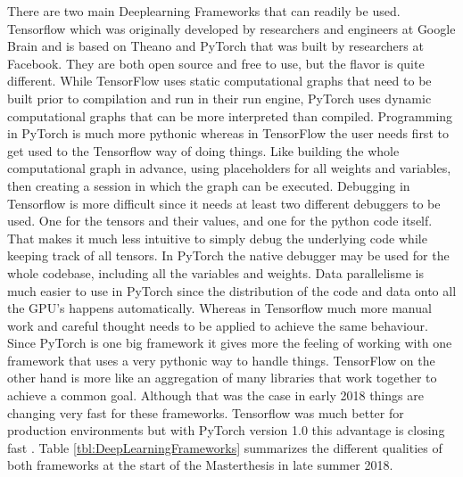 There are two main Deeplearning Frameworks that can readily be used. Tensorflow \cite{tensorflow} which was originally developed by researchers and engineers at Google Brain and is based on Theano and PyTorch \cite{pytorch} that was built by researchers at Facebook. They are both open source and free to use, but the flavor is quite different. While TensorFlow uses static computational graphs that need to be built prior to compilation and run in their run engine, PyTorch uses dynamic computational graphs that can be more interpreted than compiled. Programming in PyTorch is much more pythonic whereas in TensorFlow the user needs first to get used to the Tensorflow way of doing things. Like building the whole computational graph in advance, using placeholders for all weights and variables, then creating a session in which the graph can be executed. Debugging in Tensorflow is more difficult since it needs at least two different debuggers to be used. One for the tensors and their values, and one for the python code itself. That makes it much less intuitive to simply debug the underlying code while keeping track of all tensors. In PyTorch the native debugger may be used for the whole codebase, including all the variables and weights. Data parallelisme is much easier to use in PyTorch since the distribution of the code and data onto all the GPU's happens automatically. Whereas in Tensorflow much more manual work and careful thought needs to be applied to achieve the same behaviour. Since PyTorch is one big framework it gives more the feeling of working with one framework that uses a very pythonic way to handle things. TensorFlow on the other hand is more like an aggregation of many libraries that work together to achieve a common goal. Although that was the case in early 2018 things are changing very fast for these frameworks. Tensorflow was much better for production environments but with PyTorch version 1.0 this advantage is closing fast \cite{pytorchOnePointZero}. Table \ref{tbl:DeepLearningFrameworks} summarizes the different qualities of  both frameworks at the start of the Masterthesis in late summer 2018. \\

